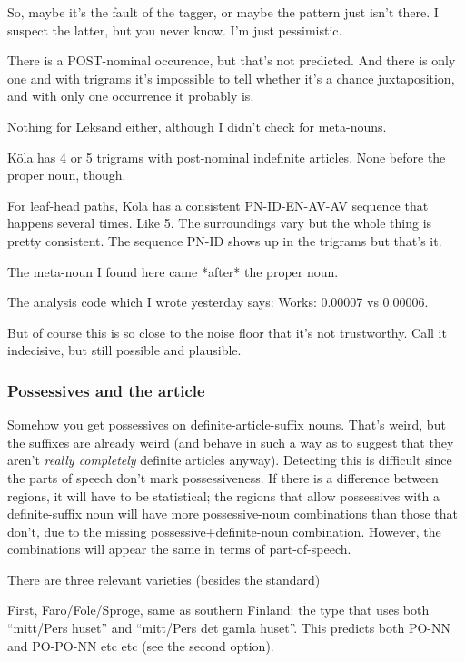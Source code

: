 So, maybe it's the fault of the tagger, or maybe the pattern just
isn't there. I suspect the latter, but you never know. I'm just
pessimistic.

There is a POST-nominal occurence, but that's not predicted. And
there is only one and with trigrams it's impossible to tell whether
it's a chance juxtaposition, and with only one occurrence it probably
is.

Nothing for Leksand either, although I didn't check for meta-nouns.

K\"ola has 4 or 5 trigrams with post-nominal indefinite articles. None
before the proper noun, though.

For leaf-head paths, K\"ola has a consistent PN-ID-EN-AV-AV sequence
that happens several times. Like 5. The surroundings vary but the
whole thing is pretty consistent. The sequence PN-ID shows up in the
trigrams but that's it.

The meta-noun I found here came *after* the proper noun.

The analysis code which I wrote yesterday says:
Works: 0.00007 vs 0.00006.

But of course this is so close to the noise floor that it's not
trustworthy. Call it indecisive, but still possible and plausible.

\subsubsection{Possessives and the article}

Somehow you get possessives on definite-article-suffix nouns. That's
weird, but the suffixes are already weird (and behave in such a way as
to suggest that they aren't {\it really completely} definite articles
anyway). Detecting this is difficult since the parts of speech don't
mark possessiveness. If there is a difference between regions, it will
have to be statistical; the regions that allow possessives with a
definite-suffix noun will have more possessive-noun combinations than
those that don't, due to the missing possessive$+$definite-noun
combination. However, the combinations will appear the same in terms
of part-of-speech.

There are three relevant varieties (besides the standard)

First, Faro/Fole/Sproge, same as southern Finland: the type that uses
both ``mitt/Pers huset'' and ``mitt/Pers det gamla huset''. This
predicts both PO-NN and PO-PO-NN etc etc (see the second option).

